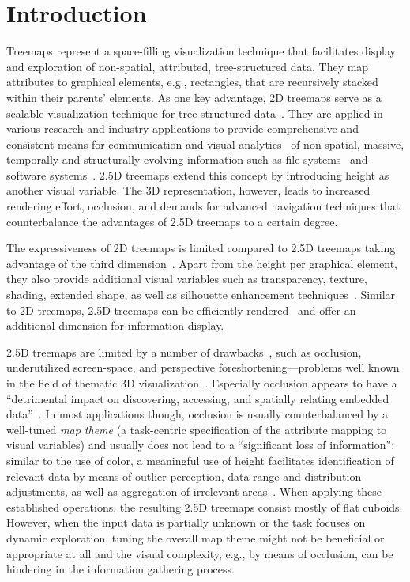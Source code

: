 
\section{Introduction}%
\label{sec:introduction}
\noindent
Treemaps represent a space-filling visualization technique that facilitates display and exploration of non-spatial, attributed, tree-structured data.
They map attributes to graphical elements, e.g., rectangles, that are recursively stacked within their parents' elements.
As one key advantage, 2D treemaps serve as a scalable visualization technique for tree-structured data~\cite{Fekete2002}.
They are applied in various research and industry applications to provide comprehensive and consistent means for communication and visual analytics~\cite{MacEachren1995} of non-spatial, massive, temporally and structurally evolving information such as file systems~\cite{Shneiderman1992} and software systems~\cite{Limberger2013}.
2.5D treemaps extend this concept by introducing height as another visual variable.
The 3D representation, however, leads to increased rendering effort, occlusion, and demands for advanced navigation techniques that counterbalance the advantages of 2.5D treemaps to a certain degree.

The expressiveness of 2D treemaps is limited compared to 2.5D treemaps taking advantage of the third dimension~\cite{Schulz2011}.
Apart from the height per graphical element, they also provide additional visual variables such as transparency, texture, shading, extended shape, as well as silhouette enhancement techniques~\cite{Limberger2016}.
Similar to 2D treemaps, 2.5D treemaps can be efficiently rendered~\cite{Trapp2013} and offer an additional dimension for information display.

2.5D treemaps are limited by a number of drawbacks~\cite{VanWijk2003,Schulz2011}, such as occlusion, underutilized screen-space, and perspective foreshortening---problems well known in the field of thematic 3D visualization~\cite{Elmqvist2008,Lorenz2008}.
Especially occlusion appears to have a \enquote{detrimental impact on discovering, accessing, and spatially relating embedded data}~\cite{Roehlig2016}.
In most applications though, occlusion is usually counterbalanced by a well-tuned \emph{map theme} (a task-centric specification of the attribute mapping to visual variables) and usually does not lead to a \enquote{significant loss of information}:
similar to the use of color, a meaningful use of height facilitates identification of relevant data by means of outlier perception, data range and distribution adjustments, as well as aggregation of irrelevant areas~\cite{Limberger2017}.
When applying these established operations, the resulting 2.5D treemaps consist mostly of flat cuboids.
However, when the input data is partially unknown or the task focuses on dynamic exploration, tuning the overall map theme might not be beneficial or appropriate at all and the visual complexity, e.g., by means of occlusion, can be hindering in the information gathering process.

